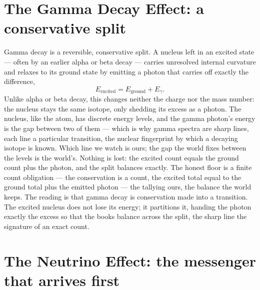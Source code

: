 \section{The Gamma Decay Effect: a conservative split}
\label{se:gamma-decay}

Gamma decay is a reversible, conservative split. A nucleus left in an excited state --- often by an earlier
alpha or beta decay --- carries unresolved internal curvature and relaxes to its ground state by emitting a
photon that carries off exactly the difference,
\begin{equation}
  E_{\text{excited}} = E_{\text{ground}} + E_\gamma .
\end{equation}
Unlike alpha or beta decay, this changes neither the charge nor the mass number: the nucleus stays the same
isotope, only shedding its excess as a photon. The nucleus, like the atom, has discrete energy levels, and the gamma photon's energy is the gap between two of
them --- which is why gamma spectra are sharp lines, each line a particular transition, the nuclear fingerprint
by which a decaying isotope is known. Which line we watch is ours; the gap the world fixes between the levels
is the world's. Nothing is lost: the excited count equals the ground count plus the
photon, and the split balances exactly. The honest floor is a finite count obligation --- the conservation is a
count, the excited total equal to the ground total plus the emitted photon --- the tallying ours, the balance
the world keeps. The reading is that gamma decay is conservation made into a transition. The excited nucleus does not lose its energy; it partitions it, handing
the photon exactly the excess so that the books balance across the split, the sharp line the signature of an
exact count.

\section{The Neutrino Effect: the messenger that arrives first}
\label{se:neutrino}

